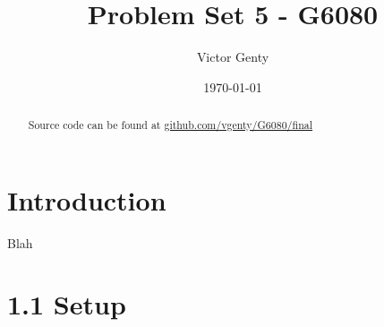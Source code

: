 \documentclass[singlepage,notitlepage,nofootinbib,11pt]{revtex4-1}
\begin{document}
\title{Problem Set 5 - G6080}
\author{Victor Genty}
\date{\today}
\begin{abstract}
\centering
Source code can be found at \href{https://github.com/vgenty/G6080/tree/master/final}{github.com/vgenty/G6080/final}
\end{abstract}
\maketitle
\section*{Introduction}
Blah
\section*{1.1 Setup}
\end{document}
